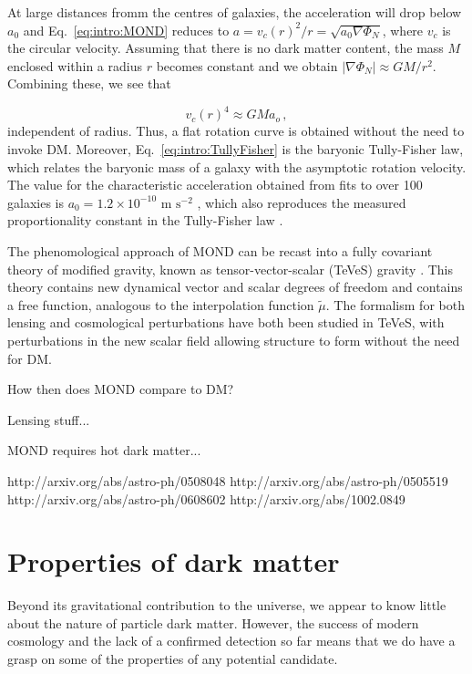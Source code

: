 At large distances fromm the centres of galaxies, the acceleration will drop below $a_0$ and Eq.~\ref{eq:intro:MOND} reduces to $a = v_c(r)^2/r = \sqrt{a_0 \nabla \Phi_N}$, where $v_c$ is the circular velocity. Assuming that there is no dark matter content, the mass $M$ enclosed within a radius $r$ becomes constant and we obtain $|\nabla \Phi_N| \approx GM/r^2$. Combining these, we see that

\begin{equation}
\label{eq:intro:TullyFisher}
v_c(r)^4 \approx GM a_o\,,
\end{equation}
independent of radius. Thus, a flat rotation curve is obtained without the need to invoke DM. Moreover, Eq.~\ref{eq:intro:TullyFisher} is the baryonic Tully-Fisher law, which relates the baryonic mass of a galaxy with the asymptotic rotation velocity. The value for the characteristic acceleration obtained from fits to over 100 galaxies is $a_0 = 1.2 \times 10^{-10} \textrm{ m s}^{-2}$ \cite{Begeman:1991}, which also reproduces the measured proportionality constant in the Tully-Fisher law \cite{McGaugh:2005}.

The phenomological approach of MOND can be recast into a fully covariant theory of modified gravity, known as tensor-vector-scalar (TeVeS) gravity \cite{Bekenstein:2005}. This theory contains new dynamical vector and scalar degrees of freedom and contains a free function, analogous to the interpolation function $\tilde{\mu}$. The formalism for both lensing \cite{Chiu:2005} and cosmological perturbations \cite{Skordis:2006} have both been studied in TeVeS, with perturbations in the new scalar field allowing structure to form without the need for DM.

How then does MOND compare to DM?

\cite{Zhao:2006} Lensing stuff...

MOND requires hot dark matter...


http://arxiv.org/abs/astro-ph/0508048
http://arxiv.org/abs/astro-ph/0505519
http://arxiv.org/abs/astro-ph/0608602
http://arxiv.org/abs/1002.0849


\section{Properties of dark matter}
\label{intro:sec:properties}

Beyond its gravitational contribution to the universe, we appear to know little about the nature of particle dark matter. However, the success of modern cosmology and the lack of a confirmed detection so far means that we do have a grasp on some of the properties of any potential candidate.

